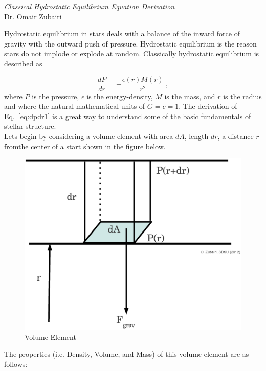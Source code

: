 \documentclass{article}
\begin{document}
\begin{center}
\textit{\Large{Classical Hydrostatic Equilibrium Equation Derivation}}\\[0.25cm]
\large{Dr. Omair Zubairi}\\
\end{center}

\vspace{0.5cm}
\noindent Hydrostatic equilibrium in stars deals with a balance of the inward force of gravity with the outward push of pressure. Hydrostatic equilibrium is the reason stars do not implode or explode at random. Classically hydrostatic equilibrium is described as

\begin{equation}
 \label{eq:dpdr1}
\dfrac{dP}{dr}=-\dfrac{\epsilon(r)M(r)}{r^{2}}~,
\end{equation}
where $P$ is the pressure, $\epsilon$ is the energy-density, $M$ is the mass, and $r$ is the radius and where the natural mathematical units of $G=c=1$. The derivation of Eq.~\eqref{eq:dpdr1} is a great way to understand some of the basic fundamentals of stellar structure.\\

\noindent Lets begin by considering a volume element with area $dA$, length $dr$, a distance $r$ fromthe center of a start shown in the figure below.

\begin{figure}[ht]
\begin{center}
\includegraphics[scale=0.5]{equil.ps}
\caption{\label{fig:dpdr} Volume Element}
\end{center}
\end{figure}
The properties (i.e. Density, Volume, and Mass) of this volume element are as follows:
\end{document}
